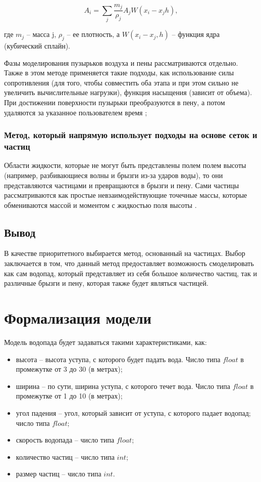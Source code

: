\begin{equation}
    A_i = \sum_j \frac{m_j}{\rho_j} A_j W (x_i - x_j h),
\end{equation}

где $m_j$ -- масса j, $\rho_j$ -- ее плотность, а $W (x_i - x_j, h)$ -- функция ядра (кубический сплайн).

Фазы моделирования пузырьков воздуха и пены рассматриваются отдельно. Также в этом методе применяется такие подходы, как использование силы сопротивления (для того, чтобы совместить оба этапа и при этом сильно не увеличить вычислительные нагрузки), функция насыщения (зависит от объема). При достижении поверхности пузырьки преобразуются в пену, а потом удаляются за указанное пользователем время \cite{sph-combo};

\subsubsection{Метод, который напрямую использует подходы на основе сеток и частиц}

Области жидкости, которые не могут быть представлены полем полем высоты (например, разбивающиеся волны и брызги из-за ударов воды), то они представляются частицами и превращаются в брызги и пену. Сами частицы рассматриваются как простые невзаимодействующие точечные массы, которые обмениваются массой и моментом с жидкостью поля высоты  \cite{real-time-combo}.


\subsection*{Вывод}
В качестве приоритетного выбирается метод, основанный на частицах. Выбор заключается в том, что данный метод предоставляет возможность смоделировать как сам водопад, который представляет из себя большое количество частиц, так и различные брызги и пену, которая также будет являться частицей.


\section{Формализация модели}
Модель водопада будет задаваться такими характеристиками, как:
\begin{itemize} 
    \item высота -- высота уступа, с которого будет падать вода. Число типа $float$ в промежутке от 3 до 30 (в метрах);
    \item ширина -- по сути, ширина уступа, с которого течет вода. Число типа $float$ в промежутке от 1 до 10 (в метрах);
    \item угол падения -- угол, который зависит от уступа, с которого падает водопад; число типа $float$;
    \item скорость водопада -- число типа $float$;
    \item количество частиц -- число типа $int$;
    \item размер частиц -- число типа $int$.
\end{itemize}

